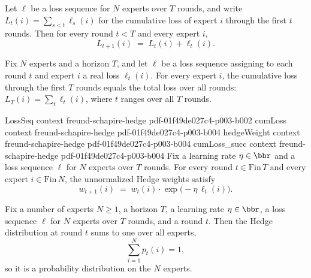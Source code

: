 \begin{lemma}
\label{cumLoss_succ}
\leanok
{}
Let $\ell$ be a loss sequence for $N$ experts over $T$ rounds, and write $L_t(i) =
\sum_{s < t} \ell_s(i)$ for the cumulative loss of expert $i$ through the first $t$
rounds. Then for every round $t < T$ and every expert $i$,
\[
  L_{t+1}(i) \;=\; L_t(i) + \ell_t(i).
\]
\end{lemma}

\begin{lemma}
\label{cumLoss_horizon}
\leanok
{}
Fix $N$ experts and a horizon $T$, and let $\ell$ be a loss sequence assigning to each
round $t$ and expert $i$ a real loss $\ell_t(i)$. For every expert $i$, the cumulative
loss through the first $T$ rounds equals the total loss over all rounds: $L_T(i) =
\sum_{t} \ell_t(i)$, where $t$ ranges over all $T$ rounds.
\end{lemma}

\begin{lemma}
\label{hedgeWeight_succ}
\leanok
{}
\proofstep
  {LossSeq}
  {context}
  {freund-schapire-hedge}
  {pdf-01f49de027c4-p003-b002}
\proofstep
  {cumLoss}
  {context}
  {freund-schapire-hedge}
  {pdf-01f49de027c4-p003-b004}
\proofstep
  {hedgeWeight}
  {context}
  {freund-schapire-hedge}
  {pdf-01f49de027c4-p003-b004}
\proofstep
  {cumLoss_succ}
  {context}
  {freund-schapire-hedge}
  {pdf-01f49de027c4-p003-b004}
Fix a learning rate $\eta \in \bbr$ and a loss sequence $\ell$ for $N$ experts over $T$
rounds. For every round $t \in \mathrm{Fin}\,T$ and every expert $i \in
\mathrm{Fin}\,N$, the unnormalized Hedge weights satisfy
\[
  w_{t+1}(i) \;=\; w_t(i)\cdot \exp\!\bigl(-\eta\,\ell_t(i)\bigr).
\]
\end{lemma}

\begin{lemma}
\label{hedgeDist_sum}
\leanok
{}
Fix a number of experts $N \ge 1$, a horizon $T$, a learning rate $\eta \in \bbr$, a
loss sequence $\ell$ for $N$ experts over $T$ rounds, and a round $t$. Then the Hedge
distribution at round $t$ sums to one over all experts,
\[
  \sum_{i=1}^{N} p_t(i) = 1,
\]
so it is a probability distribution on the $N$ experts.
\end{lemma}

